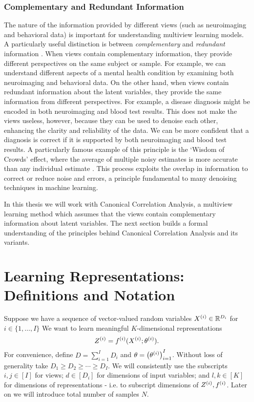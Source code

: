 \subsubsection{Complementary and Redundant Information}
The nature of the information provided by different \gls{views} (such as neuroimaging and behavioral data) is important for understanding multiview learning models.
A particularly useful distinction is between \textit{complementary} and \textit{redundant} information \citep{nguyen2020multiview}.
When views contain complementary information, they provide different perspectives on the same subject or sample.
For example, we can understand different aspects of a mental health condition by examining both neuroimaging and behavioral data.
On the other hand, when \gls{views} contain redundant information about the latent variables, they provide the same information from different perspectives.
For example, a disease diagnosis might be encoded in both neuroimaging and blood test results.
This does not make the \gls{views} useless, however, because they can be used to denoise each other, enhancing the clarity and reliability of the data. We can be more confident that a diagnosis is correct if it is supported by both neuroimaging and blood test results.
A particularly famous example of this principle is the `Wisdom of Crowds' effect, where the average of multiple noisy estimates is more accurate than any individual estimate \citep{galton1907vox}.
This process exploits the overlap in information to correct or reduce noise and errors, a principle fundamental to many denoising techniques in machine learning.

In this thesis we will work with Canonical Correlation Analysis, a multiview learning method which assumes that the \gls{views} contain complementary information about latent variables.
The next section builds a formal understanding of the principles behind Canonical Correlation Analysis and its variants.


\section{Learning Representations: Definitions and Notation}

Suppose we have a sequence of vector-valued random variables $X^{(i)} \in \mathbb{R}^{D_i}$ for $i \in \{1, \dots, I \}$
We want to learn meaningful $K$-dimensional representations
\begin{equation}
    \label{eq:general-form-of-representations}
    Z^{(i)} = f^{(i)}( X^{(i)}; \theta^{(i)}).
\end{equation}
For convenience, define $D = \sum_{i=1}^I D_i$ and $\theta = \left(\theta^{(i)}\right)_{i=1}^I$.
Without loss of generality take $D_1 \geq D_2 \geq \cdots \geq D_I$.
We will consistently use the subscripts $i,j \in [I]$ for \gls{views};
$d \in [D_i]$ for dimensions of input variables;
and $l,k \in [K]$ for dimensions of representations - i.e. to subscript dimensions of $Z^{(i)}, f^{(i)}$.
Later on we will introduce total number of samples $N$.

